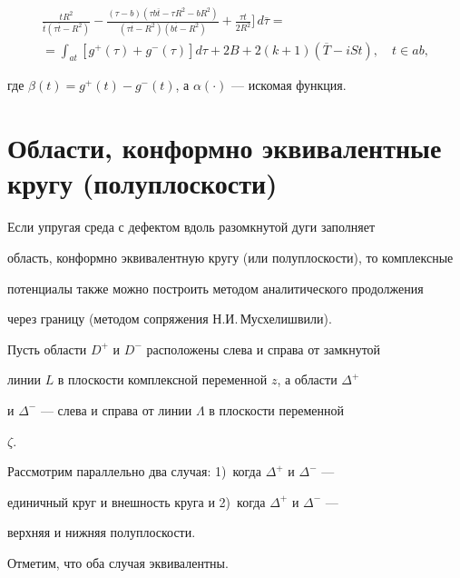 \begin{thm}
\begin{multline*}
\frac{tR^2}{\overline{t}(\tau\overline{t}-R^2)}


- \frac{(\tau-b)(\tau b\overline{t}-\tau R^2-bR^2)}


{(\tau\overline{t}-R^2)(b\overline{t}-R^2)}


+ \frac{\tau t}{2R^2} \bigg]\,d\overline{\tau} = \\


%


= \int_{at} [g^+(\tau)+g^-(\tau)]d\tau + 2B + 2(k+1)(\overline{T}-iSt),


\quad t\in ab ,


\end{multline*}


где $\beta(t)=g^+(t)-g^-(t)$, а $\alpha(\cdot)$ --- искомая функция.


\end{thm}





\section{Области, конформно эквивалентные кругу (полуплоскости)}





Если упругая среда с дефектом вдоль разомкнутой дуги заполняет


область, конформно эквивалентную кругу (или полуплоскости), то комплексные


потенциалы также можно построить методом аналитического продолжения


через границу (методом сопряжения Н.И.\,Мусхелишвили).





Пусть области $D^+$ и $D^-$ расположены слева и справа от замкнутой


линии $L$ в плоскости комплексной переменной $z$, а области $\Delta^+$


и $\Delta^-$ --- слева и справа от линии $\Lambda$ в плоскости переменной


$\zeta$.


Рассмотрим параллельно два случая: 1)~когда $\Delta^+$ и $\Delta^-$ ---


единичный круг и внешность круга и 2)~когда $\Delta^+$ и $\Delta^-$ ---


верхняя и нижняя полуплоскости. 


Отметим, что оба случая эквивалентны.





